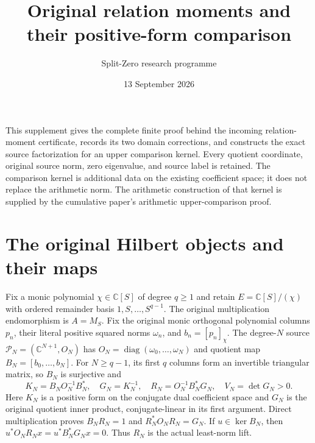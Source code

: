 \documentclass[11pt]{article}
\title{Original relation moments and their positive-form comparison}
\author{Split-Zero research programme}\date{13 September 2026}
\begin{document}
\maketitle

This supplement gives the complete finite proof behind the incoming relation-moment
certificate, records its two domain corrections, and constructs the exact source
factorization for an upper comparison kernel. Every quotient coordinate, original
source norm, zero eigenvalue, and source label is retained. The comparison kernel
is additional data on the existing coefficient space; it does not replace the
arithmetic norm. The arithmetic construction of that kernel is supplied by the
cumulative paper's arithmetic upper-comparison proof.

\section{The original Hilbert objects and their maps}
Fix a monic polynomial $\chi\in\mathbb C[S]$ of degree $q\ge1$ and retain
$E=\mathbb C[S]/(\chi)$ with ordered remainder basis $1,S,\ldots,S^{q-1}$.
The original multiplication endomorphism is $A=M_S$. Fix the original monic
orthogonal polynomial columns $p_n$, their literal positive squared norms
$\omega_n$, and $b_n=[p_n]_\chi$. The degree-$N$ source
$\mathcal P_N=(\mathbb C^{N+1},O_N)$ has
$O_N=\operatorname{diag}(\omega_0,\ldots,\omega_N)$ and quotient map
$B_N=[b_0,\ldots,b_N]$. For $N\ge q-1$, its first $q$ columns form an
invertible triangular matrix, so $B_N$ is surjective and
\begin{equation}
 K_N=B_NO_N^{-1}B_N^*,\quad G_N=K_N^{-1},\quad
 R_N=O_N^{-1}B_N^*G_N,\quad V_N=\det G_N>0.\tag{RM.1}
\end{equation}
Here $K_N$ is a positive form on the conjugate dual coefficient space and
$G_N$ is the original quotient inner product, conjugate-linear in its first
argument. Direct multiplication proves $B_NR_N=1$ and
$R_N^*O_NR_N=G_N$. If $u\in\ker B_N$, then
$u^*O_NR_Nx=u^*B_N^*G_Nx=0$. Thus $R_N$ is the actual least-norm lift.
\end{document}
